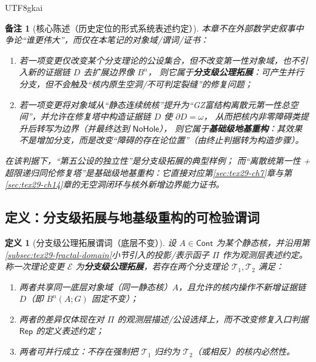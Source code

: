 \documentclass[12pt]{article}
\newtheorem{definition}{定义}[section]
\newtheorem{remark}{备注}[section]
\newcommand{\KouJing}{\texorpdfstring{表述约定}{表述约定}}
\newcommand{\GZMon}{\texorpdfstring{GZ富结构离散元}{GZ富结构离散元}}
\begin{document}
\begin{CJK*}{UTF8}{gkai}
\begin{remark}[核心陈述（历史定位的形式系统\KouJing）]
本章不在外部数学史叙事中争论“谁更伟大”，而仅在本笔记的对象域/谓词/证书：
\begin{enumerate}
  \item 若一项变更仅改变某个分支理论的公设集合，但不改变第一性对象域，也不引入新的证据链 $D$ 去扩展边界像 $B^n$，
  则它属于\textbf{分支级公理拓展}：可产生并行分支，但不会触及“核内原生空洞/不可判定裂缝”的修复问题；
  \item 若一项变更将对象域从“静态连续统核”提升为“\GZMon{}第一性总空间”，并允许在修复塔中构造证据链 $D$ 使 $\partial D=\omega$，
  从而把核内非零障碍类提升后转写为边界（并最终达到 $\mathsf{NoHole}$），
  则它属于\textbf{基础级地基重构}：其效果不是增加分支，而是改变“障碍的存在论位置”（由终止判据转为构造步骤）。
\end{enumerate}
在该判据下，“第五公设的独立性”是分支级拓展的典型样例；
而“离散统第一性 + 超限递归同伦修复塔”是基础级地基重构：它直接对应第\ref{sec:tex29-ch7}章与第\ref{sec:tex29-ch14}章的无空洞闭环与核外新增边界能力证书。
\end{remark}

\subsection{定义：分支级拓展与地基级重构的可检验谓词}
\label{subsec:tex29-ch15-defs}

\begin{definition}[分支级公理拓展谓词（底层不变）]
设 $A\in\mathsf{Cont}$ 为某个静态核，并沿用第\ref{subsec:tex29-fractal-domain}小节引入的投影/表示函子 $\Pi$ 作为观测层\KouJing。
称一次理论变更 $\mathcal{E}$ 为\textbf{分支级公理拓展}，若存在两个分支理论 $\mathcal{T}_1,\mathcal{T}_2$ 满足：
\begin{enumerate}
  \item 两者共享同一底层对象域（同一静态核）$A$，且允许的核内操作不新增证据链 $D$（即 $B^n(A;G)$ 固定不变）；
  \item 两者的差异仅体现在对 $\Pi$ 的观测层描述/公设选择上，而不改变修复入口判据 $\mathsf{Rep}$ 的定义\KouJing；
  \item 两者可并行成立：不存在强制把 $\mathcal{T}_1$ 归约为 $\mathcal{T}_2$（或相反）的核内必然性。
\end{enumerate}
\end{definition}


\end{CJK*}
\end{document}
